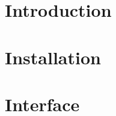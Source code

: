 \documentclass[12pt]{article}
\begin{document}
\begin{screen}
\ppttitle
\end{screen}
\footskip 0.7cm
\newpage


\newpage
\section{Introduction}

\newpage
\section{Installation}

\newpage
\section{Interface}

\end{document}
